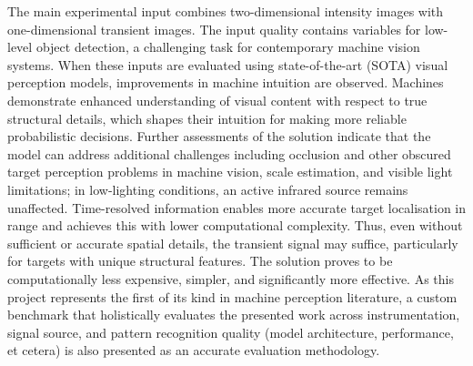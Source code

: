\documentclass[12pt,a4paper,oneside]{report}
\begin{document}
The main experimental input combines two-dimensional intensity images with one-dimensional transient images. The input quality contains variables for low-level object detection, a challenging task for contemporary machine vision systems. When these inputs are evaluated using state-of-the-art (SOTA) visual perception models, improvements in machine intuition are observed. Machines demonstrate enhanced understanding of visual content with respect to true structural details, which shapes their intuition for making more reliable probabilistic decisions. Further assessments of the solution indicate that the model can address additional challenges including occlusion and other obscured target perception problems in machine vision, scale estimation, and visible light limitations; in low-lighting conditions, an active infrared source remains unaffected. Time-resolved information enables more accurate target localisation in range and achieves this with lower computational complexity. Thus, even without sufficient or accurate spatial details, the transient signal may suffice, particularly for targets with unique structural features. The solution proves to be computationally less expensive, simpler, and significantly more effective. As this project represents the first of its kind in machine perception literature, a custom benchmark that holistically evaluates the presented work across instrumentation, signal source, and pattern recognition quality (model architecture, performance, et cetera) is also presented as an accurate evaluation methodology.
\end{document}
